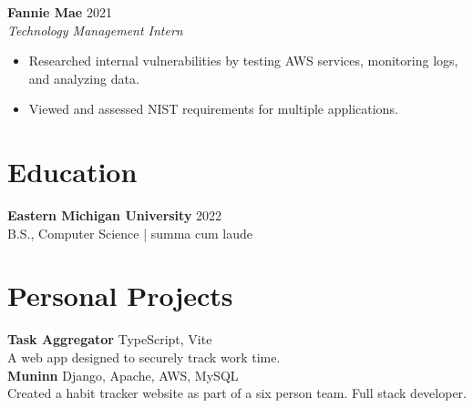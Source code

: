 \documentclass[11pt]{article}
\begin{document}
\textbf{Fannie Mae} \hfill 2021 \\
\textit{Technology Management Intern}
\begin{itemize}
  \item Researched internal vulnerabilities by testing AWS services, monitoring logs, and analyzing data.
  \item Viewed and assessed NIST requirements for multiple applications.
\end{itemize}


\section*{Education}
\textbf{Eastern Michigan University} \hfill 2022\\
B.S., Computer Science  | summa cum laude


\section*{Personal Projects}

\textbf{Task Aggregator} TypeScript, Vite\\
 A web app designed to securely track work time.   \\

\textbf{Muninn}  Django, Apache, AWS, MySQL\\
Created a habit tracker website as part of a six person team.  Full stack developer.\\
\end{document}
